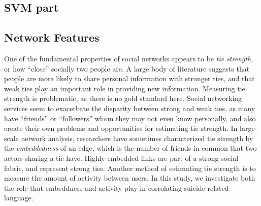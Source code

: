 \documentclass[11pt]{article}
\begin{document}
\subsection{SVM part}

\cite{svmJoachims}

\subsection{Network Features}
One of the fundamental properties of social networks appears to be \emph{tie strength}, or how ``close'' socially two people are. A large body of literature suggests that people are more likely to share personal information with stronger ties, and that weak ties play an important role in providing new information.  
Measuring tie strength is problematic, as there is no gold standard here. Social networking services seem to exacerbate the disparity between strong and weak ties, as many have ``friends'' or ``followers'' whom they may not even know personally, and also create their own problems and opportunities for estimating tie strength. In large-scale network analysis, researchers have sometimes characterized tie strength by the 
\emph{embeddedness} of an edge, which is the number of friends in common that two actors sharing a tie have. Highly embedded links are part of a strong social fabric, and represent strong ties. Another method of estimating tie strength is to measure the amount of activity between users. In this study, we investigate both the role that embeddness and activity play in corrolating suicide-related language. 
\end{document}
